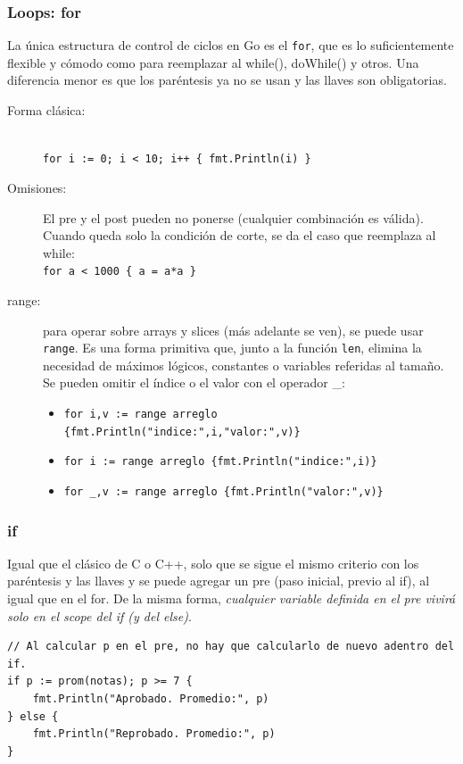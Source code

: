 \documentclass{article}
\begin{document}
\subsubsection{Loops: for}
La única estructura de control de ciclos en Go es el \lstinline|for|, que es lo suficientemente flexible y cómodo como para reemplazar al while(), do{}While() y otros. Una diferencia menor es que los paréntesis ya no se usan y las llaves son obligatorias.
\begin{description}
	\item[Forma clásica:] \hfill \\
		\lstinline|for i := 0; i < 10; i++ { fmt.Println(i) }|
	\item[Omisiones:] El pre y el post pueden no ponerse (cualquier combinación es válida). Cuando queda solo la condición de corte, se da el caso que reemplaza al while: \\
		\lstinline|for a < 1000 { a = a*a }|
	\item[range:] para operar sobre arrays y slices (más adelante se ven), se puede usar \lstinline|range|. Es una forma primitiva que, junto a la función \lstinline|len|, elimina la necesidad de máximos lógicos, constantes o variables referidas al tamaño. Se pueden omitir el índice o el valor con el operador \_:
	\begin{itemize}
	\item \lstinline|for i,v := range arreglo {fmt.Println("indice:",i,"valor:",v)}|
	\item \lstinline|for i := range arreglo {fmt.Println("indice:",i)}|
	\item \lstinline|for _,v := range arreglo {fmt.Println("valor:",v)}|
	\end{itemize}
\end{description}
\subsubsection{if}
Igual que el clásico de C o C++, solo que se sigue el mismo criterio con los paréntesis y las llaves y se puede agregar un pre (paso inicial, previo al if), al igual que en el for. De la misma forma, \emph{cualquier variable definida en el pre vivirá solo en el scope del if (y del else)}. %
\begin{lstlisting}[caption = promedio precalculado.]
// Al calcular p en el pre, no hay que calcularlo de nuevo adentro del if.
if p := prom(notas); p >= 7 {
	fmt.Println("Aprobado. Promedio:", p)
} else {
	fmt.Println("Reprobado. Promedio:", p)
}
\end{lstlisting}
\end{document}
